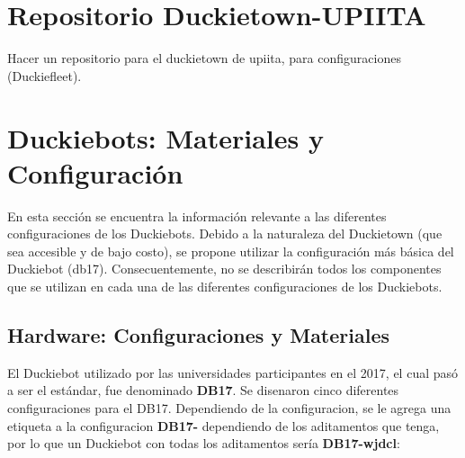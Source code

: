 \documentclass[12pt]{article}
\begin{document}
\hfill{}

\tableofcontents
\pagebreak

\section{Repositorio Duckietown-UPIITA}

Hacer un repositorio para el duckietown de upiita, para configuraciones (Duckiefleet).


\section{Duckiebots: Materiales y Configuración}

En esta sección se encuentra la información relevante a las diferentes configuraciones de los Duckiebots. Debido a la naturaleza del Duckietown (que sea accesible y de bajo costo), se propone utilizar la configuración más básica del Duckiebot (db17). Consecuentemente, no se describirán todos los componentes que se utilizan en cada una de las diferentes configuraciones de los Duckiebots. 



\subsection{Hardware: Configuraciones y Materiales}


El Duckiebot utilizado por las universidades participantes en el 2017, el cual pasó a ser el estándar, fue denominado \textbf{DB17}. Se disenaron cinco diferentes configuraciones para el DB17. Dependiendo de la configuracion, se le agrega una etiqueta a la configuracion \textbf{DB17-} dependiendo de los aditamentos que tenga, por lo que un Duckiebot con todas los aditamentos sería \textbf{DB17-wjdcl}:
\end{document}
